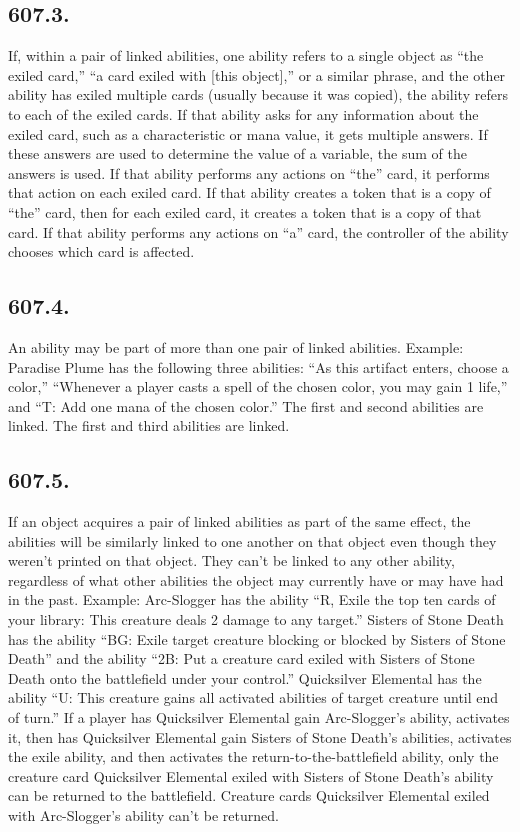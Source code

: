 \subsection*{607.3.}
If, within a pair of linked abilities, one ability refers to a single object as “the exiled card,” “a card exiled with [this object],” or a similar phrase, and the other ability has exiled multiple cards (usually because it was copied), the ability refers to each of the exiled cards. If that ability asks for any information about the exiled card, such as a characteristic or mana value, it gets multiple answers. If these answers are used to determine the value of a variable, the sum of the answers is used. If that ability performs any actions on “the” card, it performs that action on each exiled card. If that ability creates a token that is a copy of “the” card, then for each exiled card, it creates a token that is a copy of that card. If that ability performs any actions on “a” card, the controller of the ability chooses which card is affected.

\subsection*{607.4.}
An ability may be part of more than one pair of linked abilities.
Example: Paradise Plume has the following three abilities: “As this artifact enters, choose a color,” “Whenever a player casts a spell of the chosen color, you may gain 1 life,” and “{T}: Add one mana of the chosen color.” The first and second abilities are linked. The first and third abilities are linked.

\subsection*{607.5.}
If an object acquires a pair of linked abilities as part of the same effect, the abilities will be similarly linked to one another on that object even though they weren’t printed on that object. They can’t be linked to any other ability, regardless of what other abilities the object may currently have or may have had in the past.
Example: Arc-Slogger has the ability “{R}, Exile the top ten cards of your library: This creature deals 2 damage to any target.” Sisters of Stone Death has the ability “{B}{G}: Exile target creature blocking or blocked by Sisters of Stone Death” and the ability “{2}{B}: Put a creature card exiled with Sisters of Stone Death onto the battlefield under your control.” Quicksilver Elemental has the ability “{U}: This creature gains all activated abilities of target creature until end of turn.” If a player has Quicksilver Elemental gain Arc-Slogger’s ability, activates it, then has Quicksilver Elemental gain Sisters of Stone Death’s abilities, activates the exile ability, and then activates the return-to-the-battlefield ability, only the creature card Quicksilver Elemental exiled with Sisters of Stone Death’s ability can be returned to the battlefield. Creature cards Quicksilver Elemental exiled with Arc-Slogger’s ability can’t be returned.


